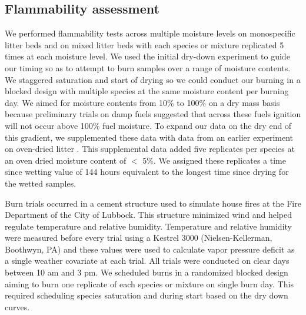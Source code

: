 \documentclass[letterpaper,12pt]{article}
\begin{document}
\subsection*{Flammability assessment}

We performed flammability tests across multiple moisture levels on monospecific
litter beds and on mixed litter beds with each species or mixture replicated 5
times at each moisture level. We used the initial dry-down experiment to guide
our timing so as to attempt to burn samples over a range of moisture contents.
We staggered saturation and start of drying so we could conduct our burning in
a blocked design with multiple species at the same moisture content per burning
day. We aimed for moisture contents from 10\% to 100\% on a dry mass basis because
preliminary trials on damp fuels suggested that across these fuels ignition
will not occur above 100\% fuel moisture. To expand our data on the dry end of
this gradient, we supplemented these data with data from an earlier experiment
on oven-dried litter \citep{Magalhaes+Schwilk-2012}. This supplemental data
added five replicates per species at an oven dried moisture content of $<$ 5\%.
We assigned these replicates a time since wetting value of 144 hours equivalent
to the longest time since drying for the wetted samples.

Burn trials occurred in a cement structure used to simulate house fires at the
Fire Department of the City of Lubbock. This structure minimized wind and
helped regulate temperature and relative humidity. Temperature and relative
humidity were measured before every trial using a Kestrel 3000
(Nielsen-Kellerman, Boothwyn, PA) and these values were used to calculate vapor
pressure deficit as a single weather covariate at each trial. All trials were
conducted on clear days between 10 am and 3 pm. We scheduled burns in a
randomized blocked design aiming to burn one replicate of each species or
mixture on single burn day. This required scheduling species saturation and
during start based on the dry down curves.
\end{document}
